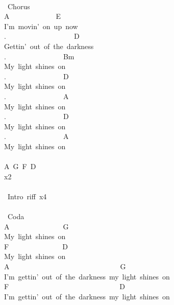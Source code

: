 {\\
\lbrack\ Chorus\rbrack\\
A\ \ \ \ \ \ \ \ \ \ \ \ \ E\\
I'm\ movin'\ on\ up\ now\\
.\ \ \ \ \ \ \ \ \ \ \ \ \ \ \ \ \ \ \ D\\
Gettin'\ out\ of\ the\ darkness\\
.\ \ \ \ \ \ \ \ \ \ \ \ \ \ \ \ Bm\\
My\ light\ shines\ on\\
.\ \ \ \ \ \ \ \ \ \ \ \ \ \ \ \ D\\
My\ light\ shines\ on\\
.\ \ \ \ \ \ \ \ \ \ \ \ \ \ \ \ A\ \ \ \\
My\ light\ shines\ on\\
.\ \ \ \ \ \ \ \ \ \ \ \ \ \ \ \ D\\
My\ light\ shines\ on\\
.\ \ \ \ \ \ \ \ \ \ \ \ \ \ \ \ A\\
My\ light\ shines\ on\\
\\
A\ G\ F\ D\\
x2\\
\\
\lbrack\ Intro\ riff\rbrack\ x4\\
\\
\lbrack\ Coda\rbrack\\
A\ \ \ \ \ \ \ \ \ \ \ \ \ \ \ G\\
My\ light\ shines\ on\\
F\ \ \ \ \ \ \ \ \ \ \ \ \ \ \ D\\
My\ light\ shines\ on\\
A\ \ \ \ \ \ \ \ \ \ \ \ \ \ \ \ \ \ \ \ \ \ \ \ \ \ \ \ \ \ \ G\\
I'm\ gettin'\ out\ of\ the\ darkness\ my\ light\ shines\ on\\
F\ \ \ \ \ \ \ \ \ \ \ \ \ \ \ \ \ \ \ \ \ \ \ \ \ \ \ \ \ \ \ D\\
I'm\ gettin'\ out\ of\ the\ darkness\ my\ light\ shines\ on}
